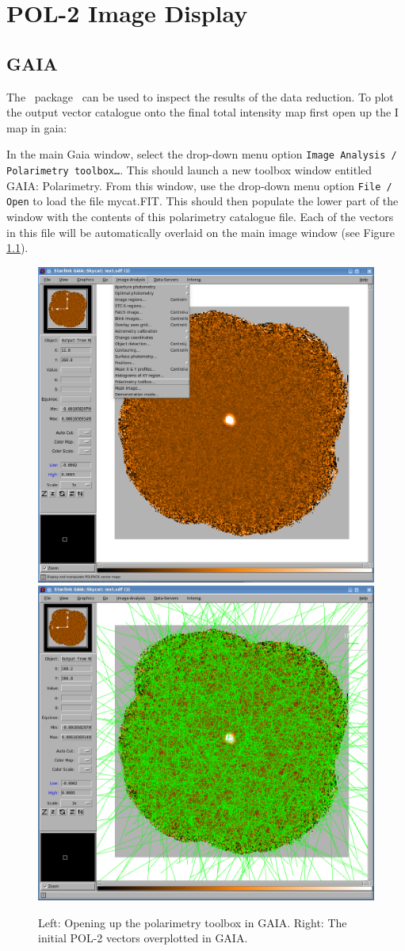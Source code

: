 \chapter{POL-2 Image Display}
\label{sec:display}

\section{GAIA}

The \starlink\ package \gaia\ can be used to inspect the results of
the data reduction.  To plot the output vector catalogue onto the
final total intensity map first open up the I map in gaia:

\begin{terminalv}
\end{terminalv}


In the main Gaia window, select the drop-down menu option
\texttt{Image Analysis / Polarimetry toolbox…}. This should launch a
new toolbox window entitled GAIA: Polarimetry. From this window, use
the drop-down menu option \texttt{File / Open} to load the file
mycat.FIT. This should then populate the lower part of the window with
the contents of this polarimetry catalogue file.  Each of the vectors
in this file will be automatically overlaid on the main image window
(see Figure \ref{fig:gaiavectorsopen}).

\begin{figure}[t!]
\begin{center}
\includegraphics[width=0.46\linewidth]{sc22-gaia-plot-vectors-1.png}
\includegraphics[width=0.46\linewidth]{sc22-gaia-plot-vectors-3.png}
\caption [Over Plotting Vectors in GAIA]{
  Left: Opening up the polarimetry toolbox in GAIA. Right: The initial POL-2
  vectors overplotted in GAIA.
\label{fig:gaiavectorsopen}
}
\end{center}
\end{figure}

